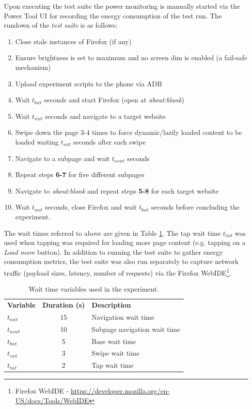 \documentclass{article}
\begin{document}
Upon executing the test suite the power monitoring is manually started via the Power Tool UI for recording the energy consumption of the test run. The rundown of the \emph{test suite} is as follows:

\begin{enumerate}
    \item Close stale instances of Firefox (if any)
    \item Ensure brightness is set to maximum and no screen dim is enabled (a fail-safe mechanism)
    \item Upload experiment scripts to the phone via ADB
    \item Wait $t_{bwt}$ seconds and start Firefox (open at \emph{about:blank})
    \item Wait $t_{nwt}$ seconds and navigate to a target website
    \item Swipe down the page 3-4 times to force dynamic/lazily loaded content to be loaded waiting $t_{swt}$ seconds after each swipe
    \item Navigate to a subpage and wait $t_{nswt}$ seconds
    \item Repeat steps \textbf{6-7} for five different subpages
    \item Navigate to \emph{about:blank} and repeat steps \textbf{5-8} for each target website
    \item Wait $t_{nwt}$ seconds, close Firefox and wait $t_{bwt}$ seconds before concluding the experiment.
\end{enumerate}

The wait times referred to above are given in Table \ref{table:wait_times}. The tap wait time $t_{twt}$ was used when tapping was required for loading more page content (e.g. tapping on a \emph{Load more} button). In addition to running the test suite to gather energy consumption metrics, the test suite was also run separately to capture network traffic (payload sizes, latency, number of requests) via the Firefox WebIDE\footnote{Firefox WebIDE - \url{https://developer.mozilla.org/en-US/docs/Tools/WebIDE}}.

\begin{table}[h!]
    \centering
    \begin{tabular}{l|c|l|}
        \textbf{Variable} & \textbf{Duration (s)} & \textbf{Description} \\
        $t_{nwt}$   & 15    & Navigation wait time \\
        $t_{nswt}$  & 10    & Subpage navigation wait time \\
        $t_{bwt}$   & 5     & Base wait time \\
        $t_{swt}$   & 3     & Swipe wait time \\
        $t_{twt}$   & 2     & Tap wait time
    \end{tabular}
    \caption{Wait time variables used in the experiment.}
    \label{table:wait_times}
\end{table}
\end{document}
